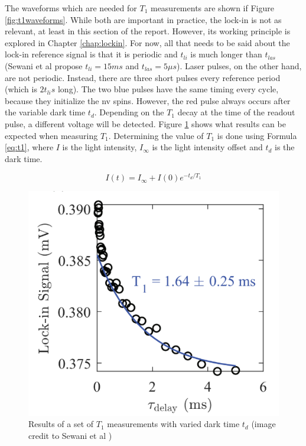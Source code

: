 The waveforms which are needed for $T_1$ measurements are shown if Figure \ref{fig:t1waveforms}. While both are important in practice, the lock-in is not as relevant, at least in this section of the report. However, its working principle is explored in Chapter \ref{chap:lockin}. For now, all that needs to be said about the lock-in reference signal is that it is periodic and $t_{li}$ is much longer than $t_{las}$ (Sewani et al \cite{sewani2020coherent} propose $t_{li} = 15 ms$ and $t_{las} = 5 \mu s$). Laser pulses, on the other hand, are not periodic. Instead, there are three short pulses every reference period (which is $2t_{li} s$ long). The two blue pulses have the same timing every cycle, because they initialize the \gls{nv} spins. However, the red pulse always occurs after the variable dark time $t_d$. Depending on the $T_1$ decay at the time of the readout pulse, a different voltage will be detected. Figure \ref{fig:t1result} shows what results can be expected when measuring $T_1$. Determining the value of $T_1$ is done using Formula \ref{eq:t1}, where $I$ is the light intensity, $I_\infty$ is the light intensity offset and $t_d$ is the dark time. 

\begin{equation}\label{eq:t1}
I(t)=I_\infty+I(0)e^{-t_d/T_1}
\end{equation}



\begin{figure}[ht]
	\centering
	\includegraphics[width=0.7\linewidth]{img/t1_result}
	\caption{Results of a set of $T_1$ measurements with varied dark time $t_d$ (image credit to Sewani et al \cite{sewani2020coherent})}
	\label{fig:t1result}
\end{figure}




